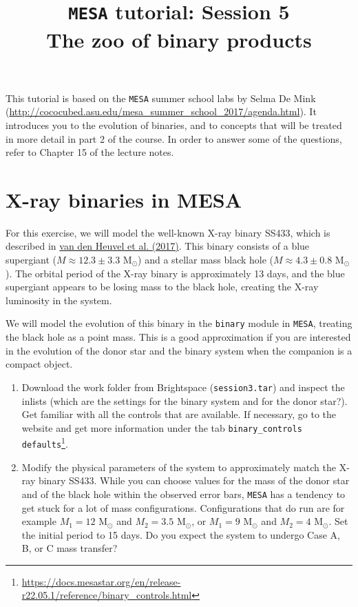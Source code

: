 \documentclass[11pt,a4paper]{article}
\begin{document}
\title{
    \textbf{\texttt{MESA} tutorial: Session 5} \\
    \textbf{\Large The zoo of binary products}
}
\date{}
\maketitle
\vspace{-1cm}


\noindent
This tutorial is based on the \texttt{MESA} summer school labs by Selma De Mink (\url{http://cococubed.asu.edu/mesa_summer_school_2017/agenda.html}). It introduces you to the evolution of binaries, and to concepts that will be treated in more detail in part 2 of the course. In order to answer some of the questions,  refer to Chapter 15 of the lecture notes.




\section{X-ray binaries in MESA}

For this exercise, we will model the well-known X-ray binary SS433, which is described in \href{https://ui.adsabs.harvard.edu/abs/2017MNRAS.471.4256V/abstract}{van den Heuvel et al. (2017)}. This binary consists of a blue supergiant ($M \approx 12.3 \pm 3.3$ M$_\odot$) and a stellar mass black hole ($M \approx 4.3 \pm 0.8$ M$_\odot$). The orbital period of the X-ray binary is approximately 13 days, and the blue supergiant appears to be losing mass to the black hole, creating the X-ray luminosity in the system.

We will model the evolution of this binary in the \texttt{binary} module in \texttt{MESA}, treating the black hole as a point mass. This is a good approximation if you are interested in the evolution of the donor star and the binary system when the companion is a compact object. 

\begin{enumerate}
  \item Download the work folder from Brightspace (\verb|session3.tar|) and inspect the inlists (which are the settings for the binary system and for the donor star?). Get familiar with all the controls that are available. If necessary, go to the website and get more information under the tab \verb|binary_controls defaults|\footnote{\url{https://docs.mesastar.org/en/release-r22.05.1/reference/binary_controls.html}}. 
  \item Modify the physical parameters of the system to approximately match the X-ray binary SS433. While you can choose values for the mass of the donor star and of the black hole within the observed error bars, \texttt{MESA} has a tendency to get stuck for a lot of mass configurations. Configurations that do run are for example $M_1=12$  M$_\odot$ and $M_2=3.5$  M$_\odot$, or $M_1=9$  M$_\odot$ and $M_2=4$  M$_\odot$. Set the initial period to 15 days. Do you expect the system to undergo Case A, B, or C mass transfer?
  \end{enumerate}
\end{document}
